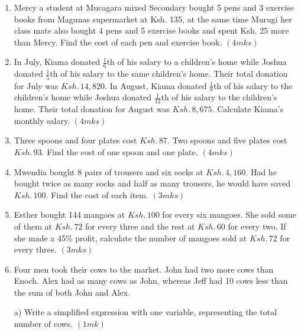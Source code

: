 \documentclass[
  a4paperpaper,
]{scrbook}
\begin{document}
\begin{tcolorbox}
\begin{enumerate}
\def\labelenumi{\arabic{enumi}.}
\setcounter{enumi}{3}
\item
  Mercy a student at Mucagara mixed Secondary bought 5 pens and 3
  exercise books from Magunas supermarket at Ksh. 135, at the same time
  Murugi her class mate also bought 4 pens and 5 exercise books and
  spent Ksh. 25 more than Mercy. Find the cost of each pen and exercise
  book. \hspace{13.2 cm} \((4mks)\)
\item
  In July, Kiama donated \(\frac{1}{6}\)th of his salary to a children's
  home while Joshua donated \(\frac{1}{5}\)th of his salary to the same
  children's home. Their total donation for July was \(Ksh.\, 14,820\).
  In August, Kiama donated \(\frac{1}{8}\)th of his salary to the
  children's home while Joshua donated \(\frac{1}{12}\)th of his salary
  to the children's home. Their total donation for August was
  \(Ksh.\, 8,675\). Calculate Kiama's monthly salary. \hspace{13.1 cm}
  \((4mks)\)
\item
  Three spoons and four plates cost \(Ksh. \,87\). Two spoons and five
  plates cost \(Ksh.\, 93\). Find the cost of one spoon and one plate.
  \hspace{9cm} \((4mks)\)
\item
  Mwendia bought 8 pairs of trousers and six socks at \(Ksh.\, 4,160\).
  Had he bought twice as many socks and half as many trousers, he would
  have saved \(Ksh.\, 100\). Find the cost of each item. \hspace{14.3cm}
  \((3mks)\)
\item
  Esther bought 144 mangoes at \(Ksh.\, 100\) for every six mangoes. She
  sold some of them at \(Ksh.\, 72\) for every three and the rest at
  \(Ksh.\, 60\) for every two. If she made a 45\% profit, calculate the
  number of mangoes sold at \(Ksh.\, 72\) for every three.
  \hspace{7.1cm} \((3mks)\)
\item
  Four men took their cows to the market. John had two more cows than
  Enoch. Alex had as many cows as John, whereas Jeff had 10 cows less
  than the sum of both John and Alex.

  a) Write a simplified expression with one variable, representing the
  total number of cows. \hspace{13.6cm} \((1mk)\)


\end{enumerate}
\end{tcolorbox}
\end{document}
